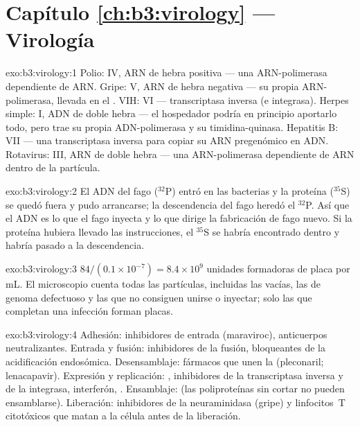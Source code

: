 \section*{Capítulo \ref{ch:b3:virology} --- Virología}

\begin{solution}{exo:b3:virology:1}
Polio: IV, ARN de hebra positiva --- una ARN-polimerasa dependiente de
ARN. Gripe: V, ARN de hebra negativa --- su propia ARN-polimerasa,
llevada en el . VIH: VI --- transcriptasa inversa (e integrasa).
Herpes simple: I, ADN de doble hebra --- el hospedador podría en
principio aportarlo todo, pero trae su propia ADN-polimerasa y su
timidina-quinasa. Hepatitis B: VII --- una transcriptasa inversa para
copiar su ARN pregenómico en ADN. Rotavirus: III, ARN de doble hebra ---
una ARN-polimerasa dependiente de ARN dentro de la partícula.
\end{solution}

\begin{solution}{exo:b3:virology:2}
El ADN del fago ($^{32}$P) entró en las bacterias y la proteína
($^{35}$S) se quedó fuera y pudo arrancarse; la descendencia del fago
heredó el $^{32}$P. Así que el ADN es lo que el fago inyecta y lo que
dirige la fabricación de fago nuevo. Si la proteína hubiera llevado las
instrucciones, el $^{35}$S se habría encontrado dentro y habría pasado a
la descendencia.
\end{solution}

\begin{solution}{exo:b3:virology:3}
$84/(0.1\times 10^{-7}) = 8.4\times 10^{9}$ unidades formadoras de placa
por mL. El microscopio cuenta todas las partículas, incluidas las
 vacías, las de genoma defectuoso y las que no consiguen unirse o
inyectar; solo las que completan una infección forman placas.
\end{solution}

\begin{solution}{exo:b3:virology:4}
Adhesión: inhibidores de entrada (maraviroc), anticuerpos
neutralizantes. Entrada y fusión: inhibidores de la fusión, bloqueantes
de la acidificación endosómica. Desensamblaje: fármacos que unen la
 (pleconaril; lenacapavir). Expresión y replicación: , inhibidores de la transcriptasa inversa y de la integrasa,
interferón, . Ensamblaje: 
(las poliproteínas sin cortar no pueden ensamblarse). Liberación:
inhibidores de la neuraminidasa (gripe) y linfocitos~T citotóxicos que
matan a la célula antes de la liberación.
\end{solution}

